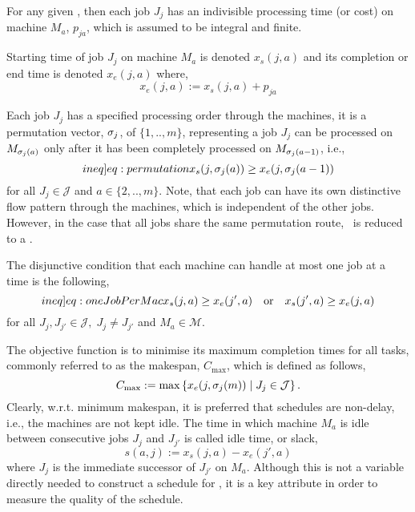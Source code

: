 For any given \JSP, then each job $J_j$ has an indivisible processing time (or 
cost) on machine $M_a$, $p_{ja}$, which is assumed to be integral and finite. 

Starting time of job $J_j$ on machine $M_a$ is denoted $x_s(j,a)$ and its 
completion or end time is denoted $x_e(j,a)$ where, 
\begin{equation}  x_e(j,a):=x_s(j,a)+p_{ja} \end{equation} 


Each job $J_j$ has a specified processing order through the machines, it is a 
permutation vector, ${\mathbf{\sigma}}_j$, of $\{1,..,m\}$, representing a job $J_j$ can 
be processed on $M_{{\mathbf{\sigma}}_j(a)}$ only after it has been completely processed 
on $M_{{\mathbf{\sigma}}_j(a-1)}$, i.e.,
\begin{equation}\label[ineq]{eq:permutation}
	x_s(j,\vsigma_j(a)) \geq x_e(j,\vsigma_j(a-1)) 
\end{equation}
for all $J_j\in\mathcal{J}$ and $a\in\{2,..,m\}$. 
Note, that each job can have its own distinctive flow pattern through the 
machines, which is independent of the other jobs. However, in the case that all 
jobs share the same permutation route, \JSP\ is reduced to a \FSP.

The disjunctive condition that each machine can handle at most one job at a time is the following,
\begin{equation}\label[ineq]{eq:oneJobPerMac}
	x_s(j,a) \geq x_e(j',a) \quad\textrm{or}\quad x_s(j',a) \geq x_e(j,a)  
\end{equation}
for all $J_j,J_{j'}\in\mathcal{J},\; J_j\neq J_{j'}$ and $M_a\in\mathcal{M}$. 

The objective function is to minimise its maximum completion times for all tasks, commonly referred to as the makespan, $C_{\max}$, which is defined as follows,
\begin{equation}
	C_{\max} := 
	\max\condset{x_e(j,\vsigma_j(m))}{J_j\in\mathcal{J}}.\label{eq:makespan}
\end{equation} 
Clearly, w.r.t. minimum makespan, it is preferred that schedules are non-delay, 
i.e., the machines are not kept idle. The time in which machine $M_a$ is idle 
between consecutive jobs $J_j$ and $J_{j'}$ is called idle time, or slack,
\begin{equation} 
  s(a,j):=x_s(j,a)-x_e(j',a) \label{eq:slack}
\end{equation}
where $J_j$ is the immediate successor of $J_{j'}$ on $M_a$. Although this is 
not a variable directly needed to construct a schedule for \JSP, it is a key 
attribute in order to measure the quality of the schedule. 

